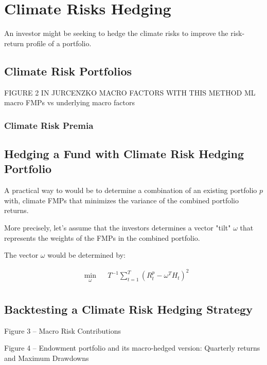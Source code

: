 \chapter{Climate Risks Hedging}

An investor might be seeking to hedge 
the climate risks to improve 
the risk-return profile of a portfolio.


\section{Climate Risk Portfolios}


FIGURE 2 IN JURCENZKO MACRO FACTORS WITH THIS METHOD
ML macro FMPs vs underlying macro factors


\subsection{Climate Risk Premia}

\section{Hedging a Fund with Climate 
Risk Hedging Portfolio}

A practical way to would be to determine 
a combination of an existing portfolio $p$ with,
climate FMPs that minimizes the variance of 
the combined portfolio returns.

More precisely, let's assume that the 
investors determines a vector "tilt" 
$\omega$ that represents the weights of
the FMPs in the combined portfolio.

The vector $\omega$ would be determined by:

\begin{equation}
    \begin{aligned}
        & \underset{\omega}{\min}
        & &   T^{-1} \sum^T_{t=1} (R^p_t - \omega^T H_t)^2\\
    \end{aligned}
\end{equation}


\section{Backtesting a Climate Risk Hedging Strategy}

Figure 3 – Macro Risk Contributions

Figure 4 – Endowment portfolio and its macro-hedged version:
Quarterly returns and Maximum Drawdowns